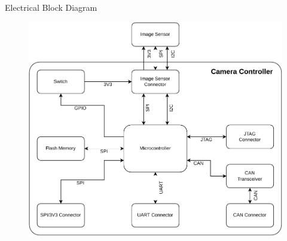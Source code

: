 \begin{frame}{Electrical Block Diagram}

    \begin{figure}[!ht]
        \begin{center}
            \includegraphics[scale=0.5]{figures/block-diagram}
        \end{center}
    \end{figure}

\end{frame}


